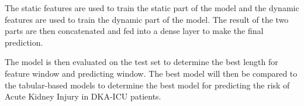 \documentclass[../main.tex]{subfiles}
\begin{document}
The static features are used to train the static part of the model and the dynamic features are used to train the dynamic part of the model.
The result of the two parts are then concatenated and fed into a dense layer to make the final prediction.

The model is then evaluated on the test set to determine the best length for feature window and predicting window.
The best model will then be compared to the tabular-based models to determine the best model for predicting the risk of Acute Kidney Injury in DKA-ICU patients.
\end{document}
